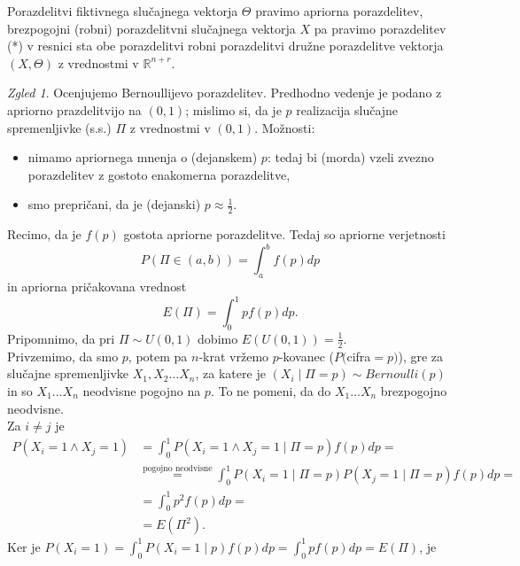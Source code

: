 \documentclass[a4paper, 12pt]{book}
\theoremstyle{definition}
\theoremstyle{remark}
\newtheorem*{exmp}{Zgled}
\newcommand{\R}{\mathbb{R}}
\begin{document}
Porazdelitvi fiktivnega slučajnega vektorja $\Theta$ pravimo apriorna porazdelitev,
brezpogojni (robni) porazdelitvni slučajnega vektorja $X$ pa pravimo  porazdelitev \\
(*) v resnici sta obe porazdelitvi robni porazdelitvi družne porazdelitve vektorja $(X, \Theta)$ z vrednostmi v $\R^{n+r}$.
\begin{exmp}
  Ocenjujemo Bernoullijevo porazdelitev. Predhodno vedenje je podano z apriorno prazdelitvijo na $(0,1)$;
  mislimo si, da je $p$ realizacija slučajne spremenljivke (s.s.) $\Pi$ z vrednostmi v $(0,1)$. Možnosti:
  \begin{itemize}
    \item nimamo apriornega mnenja o (dejanskem) $p$: tedaj bi (morda) vzeli zvezno porazdelitev z gostoto enakomerna porazdelitve,
    \item smo  prepričani, da je (dejanski) $p \approx \frac{1}{2}$. %
  \end{itemize}
\end{exmp}
Recimo, da je $f(p)$ gostota apriorne porazdelitve. Tedaj so apriorne verjetnosti
\begin{equation*}
  P(\Pi \in (a,b)) = \int_{a}^{b} f(p) dp
\end{equation*}
in apriorna pričakovana vrednost
\begin{equation*}
  E(\Pi) = \int_{0}^{1} p f(p) dp. 
\end{equation*}
Pripomnimo, da pri $\Pi \sim U(0,1)$ dobimo $E(U(0,1)) = \frac{1}{2}$. \\
Privzemimo, da smo  $p$, potem pa  $n$-krat vržemo $p$-kovanec ($P($cifra$=p)$),
gre za slučajne spremenljivke $X_1, X_2 \dots X_n$, za katere je $(X_i \mid \Pi = p) \sim Bernoulli(p)$
in so $X_1 \dots X_n$ neodvisne pogojno na $p$.
To ne pomeni, da do $X_1 \dots X_n$ brezpogojno neodvisne. \\
Za $i \neq j$ je
\begin{align*}
  P(X_i = 1 \land X_j = 1) &= \int_{0}^{1} P(X_i = 1 \land X_j = 1 \mid \Pi = p) f(p) dp = \\
  &\stackrel{\text{pogojno neodvisne}}{=}  \int_{0}^{1} P(X_i = 1 \mid \Pi = p) P(X_j = 1 \mid \Pi = p) f(p) dp = \\
  &= \int_{0}^{1} p^2 f(p) dp = \\
  &= E(\Pi^2).
\end{align*}
Ker je $P(X_i = 1) = \int_{0}^{1} P(X_i = 1 \mid p) f(p) dp = \int_{0}^{1} p f(p) dp = E(\Pi)$, je
\end{document}
